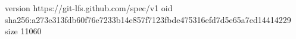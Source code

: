 version https://git-lfs.github.com/spec/v1
oid sha256:a273e313fdb60f76e7233b14e857f7123fbde475316efd7d5e65a7ed14414229
size 11060
